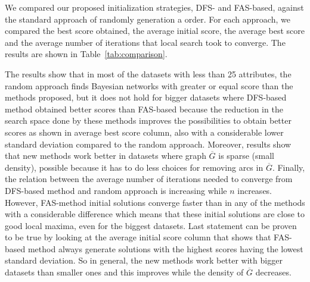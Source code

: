 We compared our proposed initialization strategies, DFS- and FAS-based, against the standard approach of randomly generation a order. For each approach, we compared the best score obtained, the average initial score, the average best score and the average number of iterations that local search took to converge. The results are shown in Table~\ref{tab:comparison}.
	
The results show that in most of the datasets with less than 25 attributes, the random approach finds Bayesian networks with greater or equal score than the methods proposed, but it does not hold for bigger datasets where DFS-based method obtained better scores than FAS-based because the reduction in the search space done by these methods improves the possibilities to obtain better scores as shown in average best score column, also with a considerable lower standard deviation compared to the random approach. Moreover, results show that new methods work better in datasets where graph $\overline G$ is sparse (small density), possible because it has to do less choices for removing arcs in $\overline G$. Finally, the relation between the average number of iterations needed to converge from DFS-based method and random approach is increasing while $n$ increases. However, FAS-method initial solutions converge faster than in any of the methods with a considerable difference which means that these initial solutions are close to good local maxima, even for the biggest datasets. Last statement can be proven to be true by looking at the average initial score column that shows that FAS-based method always generate solutions with the highest scores having the lowest standard deviation. So in general, the new methods work better with bigger datasets than smaller ones and this improves while the density of $\overline G$ decreases.

% 
